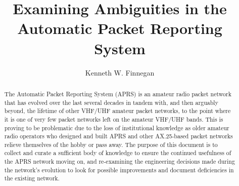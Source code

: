 \documentclass{ucthesis}
\begin{document}
\title{Examining Ambiguities in the Automatic Packet Reporting System}
\author{Kenneth W. Finnegan}
  
 
  
 
 
\maketitle

\begin{frontmatter}

\copyrightpage
\committeemembershippage

\begin{abstract}
The Automatic Packet Reporting System (APRS) is an amateur radio packet 
network that has evolved over the last several decades in tandem with, 
and then arguably beyond, the lifetime of other VHF/UHF amateur packet
networks, to the point where it is one of very few packet networks left
on the amateur VHF/UHF bands. This is proving to be problematic due to
the loss of institutional knowledge as older amateur radio operators who
designed and built APRS and other AX.25-based packet networks relieve 
themselves of the hobby or pass away. The purpose of this document is to 
collect and curate a sufficient body of knowledge to ensure the 
continued usefulness of the APRS network moving on, and re-examining 
the engineering decisions made during the network's evolution to look for
possible improvements and document deficiencies in the existing network.
\end{abstract}

\tableofcontents
\listoffigures
\end{frontmatter}








\begin{appendices}


\end{appendices}


\end{document}

